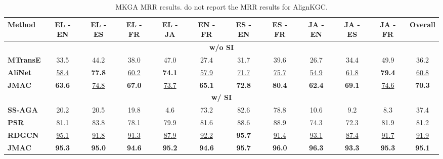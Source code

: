 \documentclass[11pt]{article}
\begin{document}
\begin{table*}[!t]
    \begin{adjustbox}{width=440pt,center}
    \centering
    \setlength{\tabcolsep}{0.3em}
    \begin{tabular}{l|c|c|c|c|c|c|c|c|c|c|c}
    \hline
    {\bf Method} & 
    \bf EL - EN & \bf EL - ES & \bf EL - FR & \bf EL - JA & \bf EN - FR & \bf ES - EN & \bf ES - FR & \bf JA - EN & \bf JA - ES & \bf JA - FR & \bf Overall \\
    \cline{2-12}
\hline
    \multicolumn{12}{c}{\textbf{w/o SI}} \\
    \hline
    \bf MTransE & 33.5 & 44.2 & 38.0 & 47.0 & 27.4 & 31.7 & 39.6 & 26.7 & 34.4 & 49.9 & 36.2 \\
    \bf AliNet & \underline{58.4} & \bf {77.8} & \underline{60.2} & \bf {74.1} & \underline{57.9} & \underline{71.7} & \underline{75.7} & \underline{54.9} & \underline{61.8} & \bf {79.4} & \underline{60.8} \\
\textbf{JMAC} & \bf 63.6 & \underline{74.8} & \bf 67.0 & \underline{73.7} & \bf 65.1 & \bf 72.8 & \bf 80.4 & \bf 62.4 & \bf 69.1 & \underline{74.6} & \bf 70.3 \\
    \hline
    \multicolumn{12}{c}{\textbf{w/ SI}} \\
    \hline
    \bf SS-AGA & 20.2 & 20.5 & 19.8 & 4.6 & 73.2 & 82.6 & 78.8 & 10.6 & 9.2 & 8.3 & 37.4 \\
    \bf PSR & 81.1 & 83.8 & 78.1 & 79.9 & 81.6 & 88.6 & 88.9 & 74.3 & 72.3 & 81.9 & 81.2 \\
    \bf RDGCN & \underline{95.1} & \underline{91.8} & \underline{91.3} & \underline{87.9} & \underline{92.2} & \bf {95.7} & \underline{91.4} & \underline{93.1} & \underline{87.4} & \underline{91.7} & \underline{91.9} \\
    \textbf{JMAC} & \bf 95.3 & \bf 95.0 & \bf 94.6 & \bf 95.2 & \bf 94.6 & \bf 95.7 & \bf 96.0 & \bf 96.3 & \bf 93.3 & \bf 95.3 & \bf 95.1 \\
    \hline 
\end{tabular}
    \end{adjustbox}
    \caption{MKGA MRR results.  do not report the MRR results for AlignKGC.}
    \label{tab:end2end_kga_detailMRR}
\end{table*}
\end{document}
